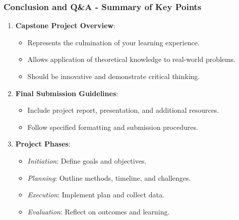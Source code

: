 \documentclass[aspectratio=169]{beamer}
\begin{document}
\begin{frame}[fragile]
  \frametitle{Conclusion and Q\&A - Summary of Key Points}
  
  \begin{enumerate}
    \item \textbf{Capstone Project Overview}:
      \begin{itemize}
        \item Represents the culmination of your learning experience.
        \item Allows application of theoretical knowledge to real-world problems.
        \item Should be innovative and demonstrate critical thinking.
      \end{itemize}
      
    \item \textbf{Final Submission Guidelines}:
      \begin{itemize}
        \item Include project report, presentation, and additional resources.
        \item Follow specified formatting and submission procedures.
      \end{itemize}
      
    \item \textbf{Project Phases}:
      \begin{itemize}
        \item \textit{Initiation}: Define goals and objectives.
        \item \textit{Planning}: Outline methods, timeline, and challenges.
        \item \textit{Execution}: Implement plan and collect data.
        \item \textit{Evaluation}: Reflect on outcomes and learning.
      \end{itemize}
  \end{enumerate}
\end{frame}
\end{document}
